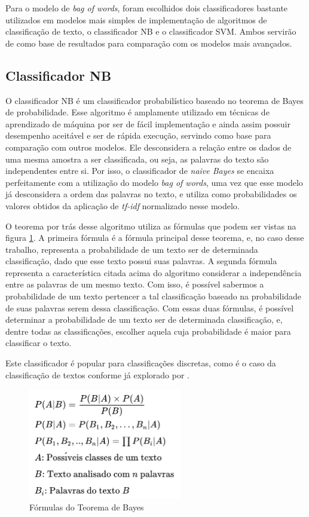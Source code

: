 Para o modelo de \textit{bag of words}, foram escolhidos dois classificadores bastante utilizados em modelos mais simples de implementação de algoritmos de classificação de texto, o classificador NB e o classificador SVM. Ambos servirão de como base de resultados para comparação com os modelos mais avançados.

\subsection{Classificador NB}
\label{theoretical_NB}
O classificador NB é um classificador probabilístico baseado no teorema de Bayes de probabilidade. Esse algoritmo é amplamente utilizado em técnicas de aprendizado de máquina por ser de fácil implementação e ainda assim possuir desempenho aceitável e ser de rápida execução, servindo como base para comparação com outros modelos. Ele desconsidera a relação entre os dados de uma mesma amostra a ser classificada, ou seja, as palavras do texto são independentes entre si. Por isso, o classificador de \textit{naive Bayes} se encaixa perfeitamente com a utilização do modelo \textit{bag of words}, uma vez que esse modelo já desconsidera a ordem das palavras no texto, e utiliza como probabilidades os valores obtidos da aplicação de \textit{tf-idf} normalizado nesse modelo. 

O teorema por trás desse algoritmo utiliza as fórmulas que podem ser vistas na figura \ref{fig:bayes_formulas}. A primeira fórmula é a fórmula principal desse teorema, e, no caso desse trabalho, representa a probabilidade de um texto ser de determinada classificação, dado que esse texto possui suas palavras. A segunda fórmula representa a característica citada acima do algoritmo considerar a independência entre as palavras de um mesmo texto. Com isso, é possível sabermos a probabilidade de um texto pertencer a tal classificação baseado na probabilidade de suas palavras serem dessa classificação. Com essas duas fórmulas, é possível determinar a probabilidade de um texto ser de determinada classificação, e, dentre todas as classificações, escolher aquela cuja probabilidade é maior para classificar o texto. 

Este classificador é popular para classificações discretas, como é o caso da classificação de textos conforme já explorado por \cite{McCallum98acomparison}.

\begin{figure}[!ht]
	\centering
    \includegraphics[width=0.6\textwidth]{figures/bayes_formulas.png}
    \caption{Fórmulas do Teorema de Bayes}
    \label{fig:bayes_formulas}
\end{figure}

